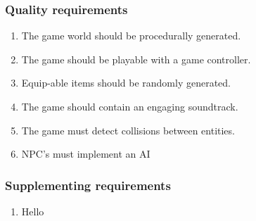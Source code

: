 \documentclass[11pt]{article}
\begin{document}
\subsubsection*{Quality requirements}
\begin{enumerate}[Q01]
	\item The game world should be procedurally generated.
	\item The game should be playable with a game controller.
	\item Equip-able items should be randomly generated.
	\item The game should contain an engaging soundtrack.
	\item The game must detect collisions between entities.
	\item NPC's must implement an AI
\end{enumerate}
\subsubsection*{Supplementing requirements}
\begin{enumerate}[S01]
	\item Hello

\end{enumerate}
\end{document}
